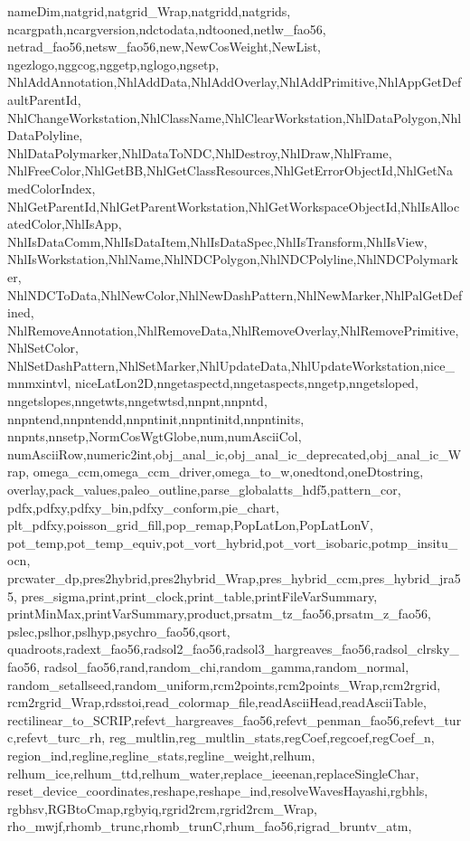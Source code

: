{{	nameDim,natgrid,natgrid_Wrap,natgridd,natgrids,
	ncargpath,ncargversion,ndctodata,ndtooned,netlw_fao56,
	netrad_fao56,netsw_fao56,new,NewCosWeight,NewList,
	ngezlogo,nggcog,nggetp,nglogo,ngsetp,
	NhlAddAnnotation,NhlAddData,NhlAddOverlay,NhlAddPrimitive,NhlAppGetDefaultParentId,
	NhlChangeWorkstation,NhlClassName,NhlClearWorkstation,NhlDataPolygon,NhlDataPolyline,
	NhlDataPolymarker,NhlDataToNDC,NhlDestroy,NhlDraw,NhlFrame,
	NhlFreeColor,NhlGetBB,NhlGetClassResources,NhlGetErrorObjectId,NhlGetNamedColorIndex,
	NhlGetParentId,NhlGetParentWorkstation,NhlGetWorkspaceObjectId,NhlIsAllocatedColor,NhlIsApp,
	NhlIsDataComm,NhlIsDataItem,NhlIsDataSpec,NhlIsTransform,NhlIsView,
	NhlIsWorkstation,NhlName,NhlNDCPolygon,NhlNDCPolyline,NhlNDCPolymarker,
	NhlNDCToData,NhlNewColor,NhlNewDashPattern,NhlNewMarker,NhlPalGetDefined,
	NhlRemoveAnnotation,NhlRemoveData,NhlRemoveOverlay,NhlRemovePrimitive,NhlSetColor,
	NhlSetDashPattern,NhlSetMarker,NhlUpdateData,NhlUpdateWorkstation,nice_mnmxintvl,
	niceLatLon2D,nngetaspectd,nngetaspects,nngetp,nngetsloped,
	nngetslopes,nngetwts,nngetwtsd,nnpnt,nnpntd,
	nnpntend,nnpntendd,nnpntinit,nnpntinitd,nnpntinits,
	nnpnts,nnsetp,NormCosWgtGlobe,num,numAsciiCol,
	numAsciiRow,numeric2int,obj_anal_ic,obj_anal_ic_deprecated,obj_anal_ic_Wrap,
	omega_ccm,omega_ccm_driver,omega_to_w,onedtond,oneDtostring,
	overlay,pack_values,paleo_outline,parse_globalatts_hdf5,pattern_cor,
	pdfx,pdfxy,pdfxy_bin,pdfxy_conform,pie_chart,
	plt_pdfxy,poisson_grid_fill,pop_remap,PopLatLon,PopLatLonV,
	pot_temp,pot_temp_equiv,pot_vort_hybrid,pot_vort_isobaric,potmp_insitu_ocn,
	prcwater_dp,pres2hybrid,pres2hybrid_Wrap,pres_hybrid_ccm,pres_hybrid_jra55,
	pres_sigma,print,print_clock,print_table,printFileVarSummary,
	printMinMax,printVarSummary,product,prsatm_tz_fao56,prsatm_z_fao56,
	pslec,pslhor,pslhyp,psychro_fao56,qsort,
	quadroots,radext_fao56,radsol2_fao56,radsol3_hargreaves_fao56,radsol_clrsky_fao56,
	radsol_fao56,rand,random_chi,random_gamma,random_normal,
	random_setallseed,random_uniform,rcm2points,rcm2points_Wrap,rcm2rgrid,
	rcm2rgrid_Wrap,rdsstoi,read_colormap_file,readAsciiHead,readAsciiTable,
	rectilinear_to_SCRIP,refevt_hargreaves_fao56,refevt_penman_fao56,refevt_turc,refevt_turc_rh,
	reg_multlin,reg_multlin_stats,regCoef,regcoef,regCoef_n,
	region_ind,regline,regline_stats,regline_weight,relhum,
	relhum_ice,relhum_ttd,relhum_water,replace_ieeenan,replaceSingleChar,
	reset_device_coordinates,reshape,reshape_ind,resolveWavesHayashi,rgbhls,
	rgbhsv,RGBtoCmap,rgbyiq,rgrid2rcm,rgrid2rcm_Wrap,
	rho_mwjf,rhomb_trunc,rhomb_trunC,rhum_fao56,rigrad_bruntv_atm,
}}
